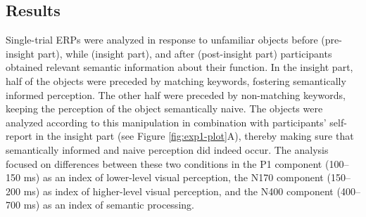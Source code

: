 \documentclass[
  english,
  doc,12pt,twoside,floatsintext]{apa7}
\begin{document}
\hypertarget{results}{%
\subsection{Results}\label{results}}

Single-trial ERPs were analyzed in response to unfamiliar objects before (pre-insight part), while (insight part), and after (post-insight part) participants obtained relevant semantic information about their function. In the insight part, half of the objects were preceded by matching keywords, fostering semantically informed perception. The other half were preceded by non-matching keywords, keeping the perception of the object semantically naive. The objects were analyzed according to this manipulation in combination with participants' self-report in the insight part (see Figure \ref{fig:exp1-plot}A), thereby making sure that semantically informed and naive perception did indeed occur. The analysis focused on differences between these two conditions in the P1 component (100--150 ms) as an index of lower-level visual perception, the N170 component (150--200 ms) as index of higher-level visual perception, and the N400 component (400--700 ms) as an index of semantic processing.
\end{document}
